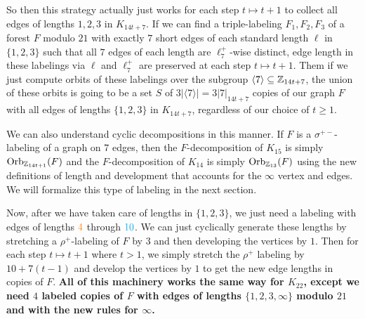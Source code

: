   So then this strategy actually just works for each step $t\mapsto t+1$ to collect all edges of lengths $1,2,3$ in $K_{14t+7}$. If we can find a triple-labeling $F_{1},F_{2},F_{3}$ of a forest $F$ modulo $21$ with exactly $7$ short edges of each standard length $\ell$ in $\{1,2,3\}$ such that all $7$ edges of each length are $\ell_{7}^{+}$-wise distinct, edge length in these labelings via $\ell$ and $\ell_{7}^{+}$ are preserved at each step $t\mapsto t+1$. Them if we just compute orbits of these labelings over the subgroup $\langle 7\rangle\subseteq \mathbb{Z}_{14t+7}$, the union of these orbits is going to be a set $S$ of $3|\langle 7\rangle|=3|7|_{14t+7}$ copies of our graph $F$ with all edges of lengths $\{1,2,3\}$ in $K_{14t+7}$, regardless of our choice of $t\geq 1$.
  
  We can also understand cyclic decompositions in this manner. If $F$ is a $\sigma^{+-}$-labeling of a graph on $7$ edges, then the $F$-decomposition of $K_{15}$ is simply $\mathrm{Orb}_{\mathbb{Z}_{14t+1}}(F)$ and the $F$-decomposition of $K_{14}$ is simply $\mathrm{Orb}_{\mathbb{Z}_{13}}(F)$ using the new definitions of length and development that accounts for the $\infty$ vertex and edges. We will formalize this type of labeling in the next section. 

  Now, after we have taken care of lengths in $\{1,2,3\}$, we just need a labeling with edges of lengths $\textcolor{orange}{4}$ through $\textcolor{cyan}{10}$. We can just cyclically generate these lengths by stretching a $\rho^{+}$-labeling of $F$ by $3$ and then developing the vertices by $1$. Then for each step $t\mapsto t+1$ where $t>1$, we simply stretch the $\rho^{+}$ labeling by $10+7(t-1)$ and develop the vertices by $1$ to get the new edge lengths in copies of $F$. \textbf{All of this machinery works the same way for $K_{22}$, except we need $4$ labeled copies of $F$ with edges of lengths $\{1,2,3,\infty\}$ modulo $21$ and with the new rules for $\infty$.}

